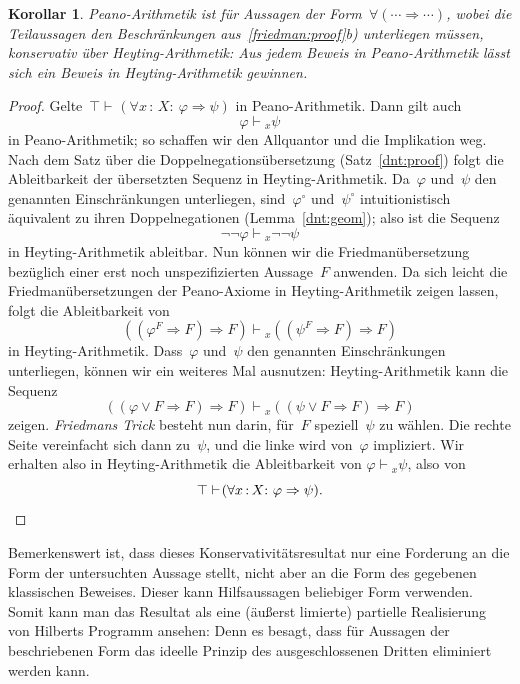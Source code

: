 \documentclass[a4paper,ngerman,12pt]{scrartcl}
\theoremstyle{definition}
\theoremstyle{plain}
\newtheorem{kor}[defn]{Korollar}
\theoremstyle{remark}
\newcommand{\seq}[1]{\mathrel{\vdash\!\!\!_{#1}}}
\renewcommand{\_}{\mathpunct{.}\,}
\newcommand{\?}{\,{:}\,}
\begin{document}
\begin{kor}\label{peanokons}Peano-Arithmetik ist für Aussagen der Form~$\forall (\cdots
\Rightarrow \cdots)$, wobei die Teilaussagen den Beschränkungen
aus~\ref{friedman:proof}b) unterliegen müssen, \emph{konservativ} über
Heyting-Arithmetik: Aus jedem Beweis in Peano-Arithmetik lässt sich ein Beweis
in Heyting-Arithmetik gewinnen.\end{kor}
\begin{proof}Gelte~$\top \seq{} (\forall x\?X{:}\ \varphi \Rightarrow \psi)$ in
Peano-Arithmetik. Dann gilt auch
\[ \varphi \seq{x} \psi \]
in Peano-Arithmetik; so schaffen wir den Allquantor und die Implikation weg.
Nach dem Satz über die Doppelnegationsübersetzung (Satz~\ref{dnt:proof}) folgt
die Ableitbarkeit der übersetzten Sequenz in Heyting-Arithmetik. Da~$\varphi$
und~$\psi$ den genannten Einschränkungen unterliegen, sind~$\varphi^\circ$
und~$\psi^\circ$ intuitionistisch äquivalent zu ihren Doppelnegationen
(Lemma~\ref{dnt:geom}); also ist die Sequenz
\[ \neg\neg\varphi \seq{x} \neg\neg\psi \]
in Heyting-Arithmetik ableitbar. Nun können wir die Friedmanübersetzung
bezüglich einer erst noch unspezifizierten Aussage~$F$ anwenden. Da sich leicht die
Friedmanübersetzungen der Peano-Axiome in Heyting-Arithmetik zeigen lassen,
folgt die Ableitbarkeit von
\[ ((\varphi^F \Rightarrow F) \Rightarrow F) \seq{x}
  ((\psi^F \Rightarrow F) \Rightarrow F) \]
in Heyting-Arithmetik. Dass~$\varphi$ und~$\psi$ den genannten Einschränkungen
unterliegen, können wir ein weiteres Mal ausnutzen: Heyting-Arithmetik kann die
Sequenz
\[ ((\varphi \vee F \Rightarrow F) \Rightarrow F) \seq{x}
  ((\psi \vee F \Rightarrow F) \Rightarrow F) \]
zeigen. \emph{Friedmans Trick} besteht nun darin, für~$F$ speziell~$\psi$ zu
wählen. Die rechte Seite vereinfacht sich dann zu~$\psi$, und die linke wird
von~$\varphi$ impliziert.
Wir erhalten also in Heyting-Arithmetik die Ableitbarkeit
von $\varphi \seq{x} \psi$, also von
\[ \top \seq{} (\forall x\?X{:}\ \varphi \Rightarrow \psi). \qedhere \]
\end{proof}

Bemerkenswert ist, dass dieses Konservativitätsresultat nur eine Forderung
an die Form der untersuchten Aussage stellt, nicht aber an die Form des gegebenen
klassischen Beweises. Dieser kann Hilfsaussagen beliebiger Form verwenden.
Somit kann man das Resultat als eine (äußerst limierte) partielle Realisierung
von Hilberts Programm ansehen: Denn es besagt, dass für Aussagen der
beschriebenen Form das ideelle Prinzip des ausgeschlossenen Dritten eliminiert
werden kann.
\end{document}
